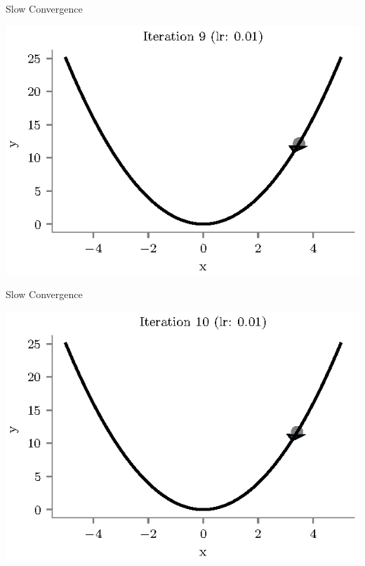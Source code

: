 \documentclass{beamer}
\begin{document}
\begin{frame}{Slow Convergence}
\begin{center}
\includegraphics[totalheight=6cm]{gradient-descent/undershooting-9.eps}
\end{center}
\end{frame}

\begin{frame}{Slow Convergence}
\begin{center}
\includegraphics[totalheight=6cm]{gradient-descent/undershooting-10.eps}
\end{center}
\end{frame}
\end{document}

